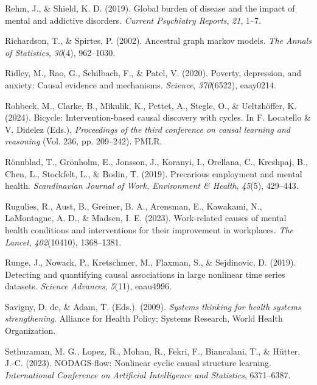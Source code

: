 \documentclass[
]{article}
\newlength{\cslhangindent}
\newenvironment{CSLReferences}[2] %
 {\begin{list}{}{%
  \setlength{\itemindent}{0pt}
  \setlength{\leftmargin}{0pt}
  \setlength{\parsep}{0pt}
  \ifodd #1
   \setlength{\leftmargin}{\cslhangindent}
   \setlength{\itemindent}{-1\cslhangindent}
  \fi
  \setlength{\itemsep}{#2\baselineskip}}}
 {\end{list}}
\begin{document}
\begin{CSLReferences}{1}{0}
Rehm, J., \& Shield, K. D. (2019). Global burden of disease and the
impact of mental and addictive disorders. \emph{Current Psychiatry
Reports}, \emph{21}, 1--7.

Richardson, T., \& Spirtes, P. (2002). Ancestral graph markov models.
\emph{The Annals of Statistics}, \emph{30}(4), 962--1030.

Ridley, M., Rao, G., Schilbach, F., \& Patel, V. (2020). Poverty,
depression, and anxiety: Causal evidence and mechanisms. \emph{Science},
\emph{370}(6522), eaay0214.

Rohbeck, M., Clarke, B., Mikulik, K., Pettet, A., Stegle, O., \&
Ueltzhöffer, K. (2024). Bicycle: Intervention-based causal discovery
with cycles. In F. Locatello \& V. Didelez (Eds.), \emph{Proceedings of
the third conference on causal learning and reasoning} (Vol. 236, pp.
209--242). PMLR.

Rönnblad, T., Grönholm, E., Jonsson, J., Koranyi, I., Orellana, C.,
Kreshpaj, B., Chen, L., Stockfelt, L., \& Bodin, T. (2019). Precarious
employment and mental health. \emph{Scandinavian Journal of Work,
Environment \& Health}, \emph{45}(5), 429--443.

Rugulies, R., Aust, B., Greiner, B. A., Arensman, E., Kawakami, N.,
LaMontagne, A. D., \& Madsen, I. E. (2023). Work-related causes of
mental health conditions and interventions for their improvement in
workplaces. \emph{The Lancet}, \emph{402}(10410), 1368--1381.

Runge, J., Nowack, P., Kretschmer, M., Flaxman, S., \& Sejdinovic, D.
(2019). Detecting and quantifying causal associations in large nonlinear
time series datasets. \emph{Science Advances}, \emph{5}(11), eaau4996.

Savigny, D. de, \& Adam, T. (Eds.). (2009). \emph{Systems thinking for
health systems strengthening}. Alliance for Health Policy; Systems
Research, World Health Organization.

Sethuraman, M. G., Lopez, R., Mohan, R., Fekri, F., Biancalani, T., \&
Hütter, J.-C. (2023). NODAGS-flow: Nonlinear cyclic causal structure
learning. \emph{International Conference on Artificial Intelligence and
Statistics}, 6371--6387.


\end{CSLReferences}
\end{document}
